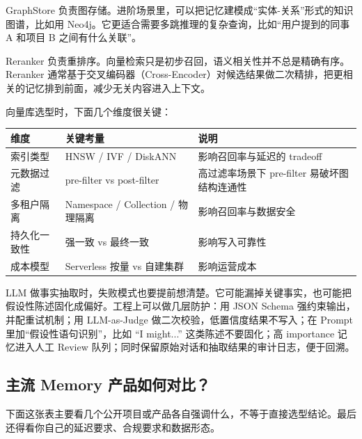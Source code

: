 \documentclass[10pt,a4paper]{ctexart}
\begin{document}
GraphStore 负责图存储。进阶场景里，可以把记忆建模成“实体-关系”形式的知识图谱，比如用 Neo4j。它更适合需要多跳推理的复杂查询，比如“用户提到的同事 A 和项目 B 之间有什么关联”。



Reranker 负责重排序。向量检索只是初步召回，语义相关性并不总是精确有序。Reranker 通常基于交叉编码器（Cross-Encoder）对候选结果做二次精排，把更相关的记忆排到前面，减少无关内容进入上下文。



向量库选型时，下面几个维度很关键：


{\footnotesize
\begin{tabularx}{\textwidth}{|X|X|X|}
\hline
\textbf{维度} & \textbf{关键考量} & \textbf{说明} \\
\hline
索引类型 & HNSW / IVF / DiskANN & 影响召回率与延迟的 tradeoff \\
\hline
元数据过滤 & pre-filter vs post-filter & 高过滤率场景下 pre-filter 易破坏图结构连通性 \\
\hline
多租户隔离 & Namespace / Collection / 物理隔离 & 影响召回率与数据安全 \\
\hline
持久化一致性 & 强一致 vs 最终一致 & 影响写入可靠性 \\
\hline
成本模型 & Serverless 按量 vs 自建集群 & 影响运营成本 \\
\hline
\end{tabularx}
}



LLM 做事实抽取时，失败模式也要提前想清楚。它可能漏掉关键事实，也可能把假设性陈述固化成偏好。工程上可以做几层防护：用 JSON Schema 强约束输出，并配重试机制；用 LLM-as-Judge 做二次校验，低置信度结果不写入；在 Prompt 里加“假设性语句识别”，比如 “I might...” 这类陈述不要固化；高 importance 记忆进入人工 Review 队列；同时保留原始对话和抽取结果的审计日志，便于回溯。



\subsection{主流 Memory 产品如何对比？}


下面这张表主要看几个公开项目或产品各自强调什么，不等于直接选型结论。最后还得看你自己的延迟要求、合规要求和数据形态。
\end{document}
